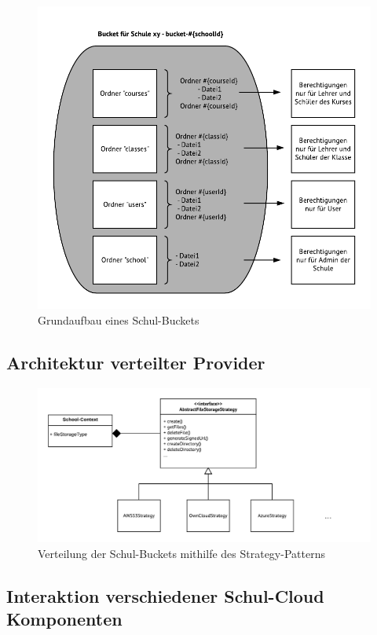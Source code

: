 \begin{figure}[H]
	\centering
	\includegraphics[width=0.8\linewidth]{images/AufbauDateiverwaltung}
	\caption[Caption for concept]{Grundaufbau eines Schul-Buckets}
\end{figure}

\subsection{Architektur verteilter Provider}

\begin{figure}[H]
	\centering
	\includegraphics[width=1\linewidth]{images/strategypattern}
	\caption[Caption for concept]{Verteilung der Schul-Buckets mithilfe des Strategy-Patterns}
\end{figure}

\subsection{Interaktion verschiedener Schul-Cloud Komponenten}

